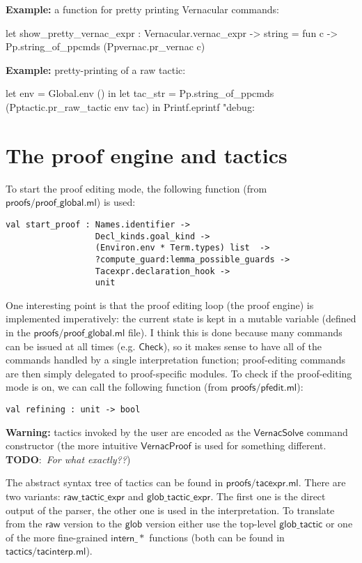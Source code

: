 \documentclass[a4paper,oneside]{book}
\newcommand{\m}[1]{\ensuremath{\mathsf{#1}}}
\newcommand{\TODO}[1]{\textbf{TODO}:\ \emph{#1}}
\begin{document}
\noindent
\textbf{Example:} a function for pretty printing Vernacular commands:

\begin{code}
let show_pretty_vernac_expr : Vernacular.vernac_expr -> string = 
  fun c -> Pp.string_of_ppcmds (Ppvernac.pr_vernac c)
\end{code}

\noindent
\textbf{Example:} pretty-printing of a raw tactic:

\begin{code}
let env = Global.env () in
let tac_str = Pp.string_of_ppcmds (Pptactic.pr_raw_tactic env tac) in
Printf.eprintf "debug: %
\end{code}

\section{The proof engine and tactics}

To start the proof editing mode, the following function (from
\m{proofs/proof\_global.ml}) is used:
\begin{lstlisting}
val start_proof : Names.identifier -> 
                  Decl_kinds.goal_kind ->
                  (Environ.env * Term.types) list  ->
                  ?compute_guard:lemma_possible_guards -> 
                  Tacexpr.declaration_hook -> 
                  unit
\end{lstlisting}

One interesting point is that the proof editing loop (the proof
engine) is implemented imperatively: the current state is kept in a
mutable variable (defined in the \m{proofs/proof\_global.ml} file). I
think this is done because many commands can be issued at all times
(e.g. \m{Check}), so it makes sense to have all of the commands
handled by a single interpretation function; proof-editing commands
are then simply delegated to proof-specific modules. To check if the
proof-editing mode is on, we can call the following function (from
\m{proofs/pfedit.ml}):
\begin{lstlisting}
val refining : unit -> bool
\end{lstlisting}
\textbf{Warning:} tactics invoked by the user are encoded as
the \m{VernacSolve} command constructor (the more intuitive
\m{VernacProof} is used for something different. \TODO{For what
  exactly??})

The abstract syntax tree of tactics can be found in
\m{proofs/tacexpr.ml}. There are two variants: \m{raw\_tactic\_expr}
and \m{glob\_tactic\_expr}. The first one is the direct output of the
parser, the other one is used in the interpretation. To translate from
the \m{raw} version to the \m{glob} version either use the top-level
\m{glob\_tactic} or one of the more fine-grained \m{intern\_*} functions
(both can be found in \m{tactics/tacinterp.ml}).
\end{document}
